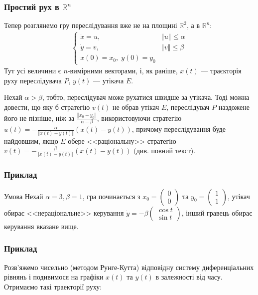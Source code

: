\documentclass[10pt,pdf]{beamer}
\newcommand{\R}{\mathbb{R}}
\renewcommand{\d}[1]{\dot{#1}}
\newcommand{\norm}[1]{\left\Vert #1 \right\Vert}
\begin{document}
    \begin{frame}
        \frametitle{Простий рух в $\R^n$}
    
        Тепер розглянемо гру переслідування вже не на площині $\R^2$, а в $\R^n$:
        \begin{gather*}
            \begin{cases}
                \d{x} = u, & \norm{u} \leq \alpha \\
                \d{y} = v, & \norm{v} \leq \beta \\
                x(0) = x_0, \; y(0) = y_0
            \end{cases}
        \end{gather*}
        Тут усі величини є $n$-вимірними векторами, і, як раніше, $x(t)$ --- траєкторія
        руху переслідувача $P$, $y(t)$ --- утікача $E$.
    
        Нехай $\alpha > \beta$, тобто, переслідувач може рухатися швидше за утікача. 
        Тоді можна довести, що яку б стратегію $v(t)$ не обрав утікач $E$, переслідувач $P$ наздожене його не пізніше,
        ніж за $\frac{\norm{x_0 - y_0}}{\alpha - \beta}$, використовуючи стратегію $u(t) = - \frac{\alpha}{\norm{x(t) - y(t)}} (x(t) - y(t))$,
        причому переслідування буде найдовшим, якщо $E$ обере <<раціональну>> стратегію $v(t) = - \frac{\beta}{\norm{x(t) - y(t)}} (x(t) - y(t))$
        (див. повний текст).

    \end{frame}
    \begin{frame}
        \frametitle{Приклад}
    
        \begin{block}{Умова}
            Нехай $\alpha = 3, \beta = 1$, гра починається з $x_0 = \begin{pmatrix}
                0 \\ 0
            \end{pmatrix}$ та $y_0 = \begin{pmatrix}
                1 \\ 1
            \end{pmatrix}$, утікач обирає <<нераціональне>> керування $\d{y} = -\beta\begin{pmatrix}
                \cos t \\ \sin t
            \end{pmatrix}$, інший гравець обирає керування вказане вище.
        \end{block}
    \end{frame}
    \begin{frame}
        \frametitle{Приклад}
    
        Розв'яжемо чисельно (методом Рунге-Кутта) відповідну систему диференціальних рівнянь і подивимося на графіки $x(t)$ та $y(t)$ в залежності від часу.
        Отримаємо такі траекторії руху:
        \begin{center}
            \resizebox{220pt}{!}{
                
            }
        \end{center}
    \end{frame}
\end{document}
